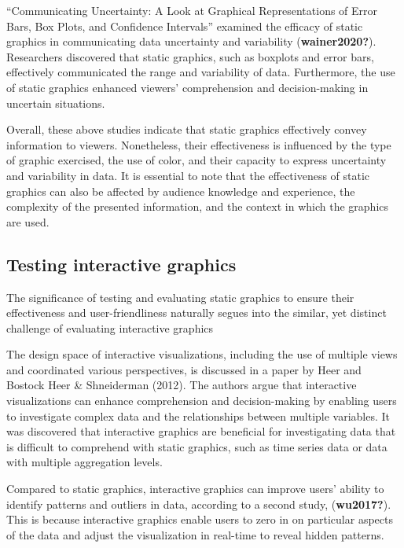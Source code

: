 \documentclass[print]{nuthesis}
\begin{document}
``Communicating Uncertainty: A Look at Graphical Representations of Error Bars, Box Plots, and Confidence Intervals'' examined the efficacy of static graphics in communicating data uncertainty and variability (\textbf{wainer2020?}).
Researchers discovered that static graphics, such as boxplots and error bars, effectively communicated the range and variability of data.
Furthermore, the use of static graphics enhanced viewers' comprehension and decision-making in uncertain situations.

Overall, these above studies indicate that static graphics effectively convey information to viewers.
Nonetheless, their effectiveness is influenced by the type of graphic exercised, the use of color, and their capacity to express uncertainty and variability in data.
It is essential to note that the effectiveness of static graphics can also be affected by audience knowledge and experience, the complexity of the presented information, and the context in which the graphics are used.

\hypertarget{testing-interactive-graphics}{%
\subsection{Testing interactive graphics}\label{testing-interactive-graphics}}

The significance of testing and evaluating static graphics to ensure their effectiveness and user-friendliness naturally segues into the similar, yet distinct challenge of evaluating interactive graphics

The design space of interactive visualizations, including the use of multiple views and coordinated various perspectives, is discussed in a paper by Heer and Bostock Heer \& Shneiderman (2012).
The authors argue that interactive visualizations can enhance comprehension and decision-making by enabling users to investigate complex data and the relationships between multiple variables.
It was discovered that interactive graphics are beneficial for investigating data that is difficult to comprehend with static graphics, such as time series data or data with multiple aggregation levels.

Compared to static graphics, interactive graphics can improve users' ability to identify patterns and outliers in data, according to a second study, (\textbf{wu2017?}).
This is because interactive graphics enable users to zero in on particular aspects of the data and adjust the visualization in real-time to reveal hidden patterns.
\end{document}
